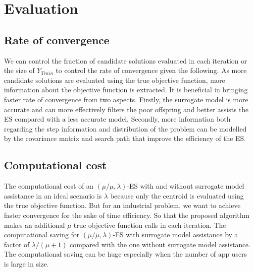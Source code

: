 \documentclass{article}
\begin{document}
\section{Evaluation}

\subsection{Rate of convergence}
We can control the fraction of candidate solutions evaluated in each iteration or the size of $Y_{Train}$ to control the rate of convergence given the following. As more candidate solutions are evaluated using the true objective function, more information about the objective function is extracted. It is beneficial in bringing faster rate of convergence from two aspects. Firstly, the surrogate model is more accurate and can more effectively filters the poor offspring and better assists the ES compared with a less accurate model. Secondly, more information both regarding the step information and distribution of the problem can be modelled by the covariance matrix and search path that improve the efficiency of the ES.


\subsection{Computational cost}

The computational cost of an $(\mu/\mu,\lambda)$-ES with and without surrogate model assistance in an ideal scenario is $\lambda$ because only the centroid is evaluated using the true objective function. But for an industrial problem, we want to achieve faster convergence for the sake of time efficiency. So that the proposed algorithm makes an additional $\mu$ true objective function calls in each iteration. The computational saving for $(\mu/\mu,\lambda)$-ES with surrogate model assistance by a factor of $\lambda/(\mu+1)$ compared with the one without surrogate model assistance. The computational saving can be huge especially when the number of app users is large in size.
\end{document}
